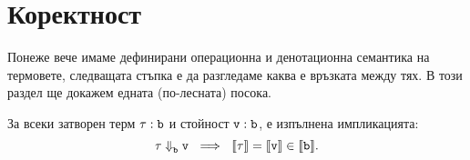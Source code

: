 \section{Коректност}

Понеже вече имаме дефинирани операционна и денотационна семантика на термовете,
следващата стъпка е да разгледаме каква е връзката между тях.
В този раздел ще докажем едната (по-лесната) посока.
\begin{framed}
  \begin{theorem}\label{th:pcf:soundness}
    За всеки затворен терм $\tau : \texttt{b}$ и стойност $\texttt{v}:\texttt{b}$, е изпълнена импликацията:
    \[\tau \opsem{}{b} \vv{v}\ \implies\ \val{\tau} = \val{\vv{v}} \in \val{\vv{b}}.\]
  \end{theorem}  
\end{framed}
